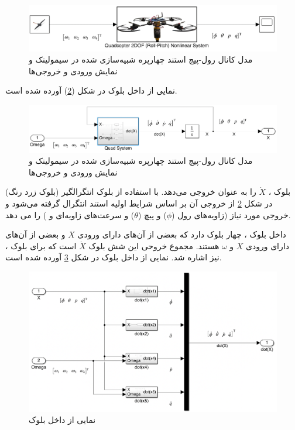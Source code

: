 \begin{figure}[H]
	\includegraphics[width=16cm]{../Figures/QuadSimulation/roll-pitch_Stand_Model.png}
	\centering
	\vspace*{-15mm}
	\caption{مدل کانال رول-پیچ استند چهارپره شبیه‌سازی شده در سیمولینک و نمایش ورودی و خروجی‌ها}
	\label{roll-pitch_quadsimulink}
\end{figure}
نمایی از داخل بلوک
در شکل (\ref{roll-pitch_Quad3DOF}) آورده شده است.
\begin{figure}[H]
	\includegraphics[width=16cm]{../Figures/QuadSimulation/roll-pitch_Integrator.png}
	\centering
	\vspace*{-15mm}
	\caption{مدل کانال رول-پیچ استند چهارپره شبیه‌سازی شده در سیمولینک و نمایش ورودی و خروجی‌ها}
	\label{roll-pitch_Quad3DOF}
\end{figure}
بلوک
،
$\dot X$ را به عنوان خروجی می‌دهد. با استفاده از بلوک انتگرالگیر (بلوک زرد رنگ) در شکل
\ref{roll-pitch_Quad3DOF}
از خروجی آن بر اساس شرایط اولیه استند انتگرال گرفته می‌شود و خروجی مورد نیاز (زاویه‌های رول ($\phi$) و  پیچ ($\theta$) و سرعت‌های زاویه‌ای‌
و
)
را می دهد.

داخل بلوک
،
چهار بلوک دارد که بعضی از آن‌های دارای ورودی $X$ و بعضی از آن‌های دارای ورودی $X$ و $\omega$ هستند. مجموع خروحی این شش بلوک $\dot X$ است که برای بلوک
،
نیز اشاره شد.
نمایی از داخل بلوک
در شکل \ref{roll-pitch_all-six} آورده شده است.
\begin{figure}[H]
	\includegraphics[width=16cm]{../Figures/QuadSimulation/roll-pitch_all-six.png}
	\centering
	\caption{نمایی از داخل بلوک }
	\label{roll-pitch_all-six}
\end{figure}